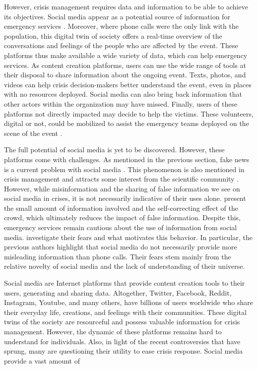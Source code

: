 However, crisis management requires data and information to be able to achieve its objectives.
Social media appear as a potential source of information for emergency services \parencite{tapiaSeekingTrustworthyTweet2011}.
Moreover, where phone calls were the only link with the population, this digital twin of society offers a real-time overview of the conversations and feelings of the people who are affected by the event.
These platforms thus make available a wide variety of data, which can help emergency services.
As content creation platforms, users can use the wide range of tools at their disposal to share information about the ongoing event.
Texts, photos, and videos can help crisis decision-makers better understand the event, even in places with no resources deployed.
Social media can also bring back information that other actors within the organization may have missed.
Finally, users of these platforms not directly impacted may decide to help the victims.
These volunteers, digital or not, could be mobilized to assist the emergency teams deployed on the scene of the event \parencite{batardIntegrerContributionsCitoyennes2021}.

The full potential of social media is yet to be discovered.
However, these platforms come with challenges.
As mentioned in the previous section, fake news is a current problem with social media \parencite{lazerScienceFakeNews2018,vosoughiSpreadTrueFalse2018,oshikawaSurveyNaturalLanguage2018}.
This phenomenon is also mentioned in crisis management and attracts some interest from the scientific community \parencite{starbirdExaminingAlternativeMedia2017,sellMisinformationUSEbola2020}.
However, while misinformation and the sharing of false information we see on social media in crises, it is not necessarily indicative of their uses alone.
\textcite{bubendorffConstructionDisseminationInformation2021} present the small amount of information involved and the self-correcting effect of the crowd, which ultimately reduces the impact of false information.
Despite this, emergency services remain cautious about the use of information from social media.
\textcite{tapiaGoodEnoughGood2014} investigate their fears and what motivates this behavior.
In particular, the previous authors highlight that social media do not necessarily provide more misleading information than phone calls.
Their fears stem mainly from the relative novelty of social media and the lack of understanding of their universe.

Social media are Internet platforms that provide content creation tools to their users, generating and sharing data.
Altogether, Twitter, Facebook, Reddit, Instagram, Youtube, and many others, have billions of users worldwide who share their everyday life, creations, and feelings with their communities.
These digital twins of the society are resourceful and possess valuable information for crisis management.
However, the dynamic of these platforms remains hard to understand for individuals.
Also, in light of the recent controversies that have sprung, many are questioning their utility to ease crisis response.
Social media provide a vast amount of

